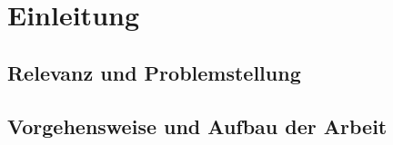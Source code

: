 \section{Einleitung}

\subsection{Relevanz und Problemstellung}

\subsection{Vorgehensweise und Aufbau der Arbeit}

